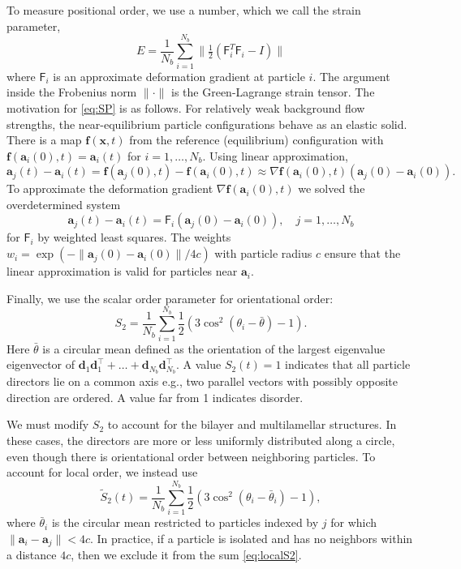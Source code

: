 \documentclass[prb,preprint,showpacs,preprintnumbers,amsmath,amssymb,longbibliography]{revtex4-1}
\renewcommand{\aa}{\mathbf{a}}
\newcommand{\dd}{\mathbf{d}}
\newcommand{\ff}{\mathbf{f}}
\newcommand{\xx}{\mathbf{x}}
\begin{document}
To measure positional order, we use a number,
which we call the strain parameter, 
\begin{equation}
\label{eq:SP}
E = \frac{1}{N_b} \sum_{i=1}^{N_b}
\|\tfrac{1}{2}(\mathsf{F}_i^T \mathsf{F}_i - I)\|
\end{equation}
where $\mathsf{F}_i$ is an 
approximate deformation gradient at particle $i$.
The argument inside the Frobenius norm $\| \cdot \|$
is the Green-Lagrange strain tensor.
The motivation for  \eqref{eq:SP} is as follows.
For relatively weak background flow strengths, the near-equilibrium particle
configurations behave as an elastic solid.  There is a map $\ff(\xx,t)$
from the reference (equilibrium) configuration with $\ff(\aa_i(0),t) = \aa_i(t)$
for $i = 1,\dots,N_b$.  Using linear approximation,
\[
\aa_j(t) - \aa_i(t) = \ff(\aa_j(0),t) - \ff(\aa_i(0),t)
\approx \nabla \ff(\aa_i(0),t)(\aa_j(0) - \aa_i(0)).
\]
To approximate
the deformation gradient $\nabla \ff(\aa_i(0),t)$
we solved the overdetermined system 
\[
\aa_j(t) - \aa_i(t) = \mathsf{F}_i(\aa_j(0) - \aa_i(0)),\quad j = 1,\dots, N_b  
\]
for $\mathsf{F}_i$ by weighted least squares. The weights  
$w_i = \exp(-\|\aa_j(0) - \aa_i(0)\|/4c)$ with particle radius $c$
ensure that the linear approximation is valid for
particles near $\aa_i$.

Finally, we use the scalar order parameter for orientational order:
\begin{equation}
  \label{eq:S2}
S_2 = \frac{1}{N_b} \sum_{i=1}^{N_b} \frac{1}{2}(3\cos^2(\theta_i - \bar \theta) - 1).
\end{equation}
Here $\bar \theta$ is a circular mean defined as the
orientation of the largest eigenvalue eigenvector of 
$\dd_1\dd_1^\top + \dots + \dd_{N_b}\dd_{N_b}^\top$.
A value $S_2(t) = 1$ indicates 
that all particle directors lie on a common axis e.g.,
two parallel vectors with possibly opposite direction are ordered. 
A value far from 1 indicates disorder.

We must modify $S_2$ to account for the bilayer and
multilamellar structures.  In these cases, the directors 
are more or less uniformly distributed along a circle, even though
there is orientational order between neighboring particles.
To account for local order, we instead use
\begin{equation}
  \label{eq:localS2}
\tilde{S}_2(t) = \frac{1}{N_b} \sum_{i=1}^{N_b}
\frac{1}{2}(3\cos^2(\theta_i - \bar \theta_i) - 1),
\end{equation}
where $\bar \theta_i$ is the circular mean restricted to particles
indexed by $j$ for which $\|\aa_i - \aa_j\| < 4c$. In practice, if a particle is
isolated and has no neighbors within a distance $4c$, then we exclude it from
the sum \eqref{eq:localS2}. 
\end{document}
